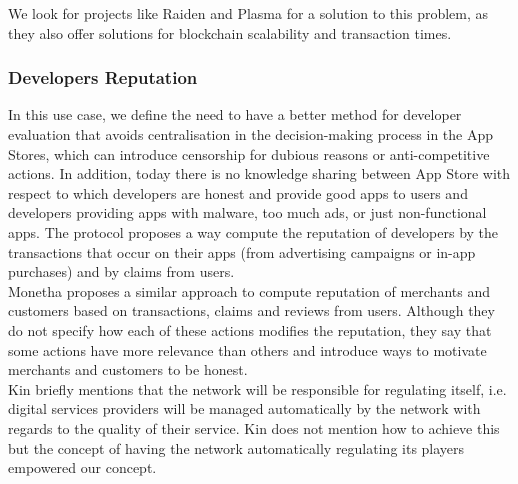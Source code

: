 We look for projects like Raiden and Plasma for a solution to this problem, as they also offer solutions for blockchain scalability and transaction times.

\subsubsection{Developers Reputation}

In this use case, we define the need to have a better method for developer evaluation that avoids centralisation in the decision-making process in the App Stores, which can introduce censorship for dubious reasons or anti-competitive actions. In addition, today there is no knowledge sharing between App Store with respect to which developers are honest and provide good apps to users and developers providing apps with malware, too much ads, or just non-functional apps. The protocol proposes a way compute the reputation of developers by the transactions that occur on their apps (from advertising campaigns or in-app purchases) and by claims from users. \\

Monetha proposes a similar approach to compute reputation of merchants and customers based on transactions, claims and reviews from users. Although they do not specify how each of these actions modifies the reputation, they say that some actions have more relevance than others and introduce ways to motivate merchants and customers to be honest. \\

Kin briefly mentions that the network will be responsible for regulating itself, i.e. digital services providers will be managed automatically by the network with regards to the quality of their service. Kin does not mention how to achieve this but the concept of having the network automatically regulating its players empowered our concept.







